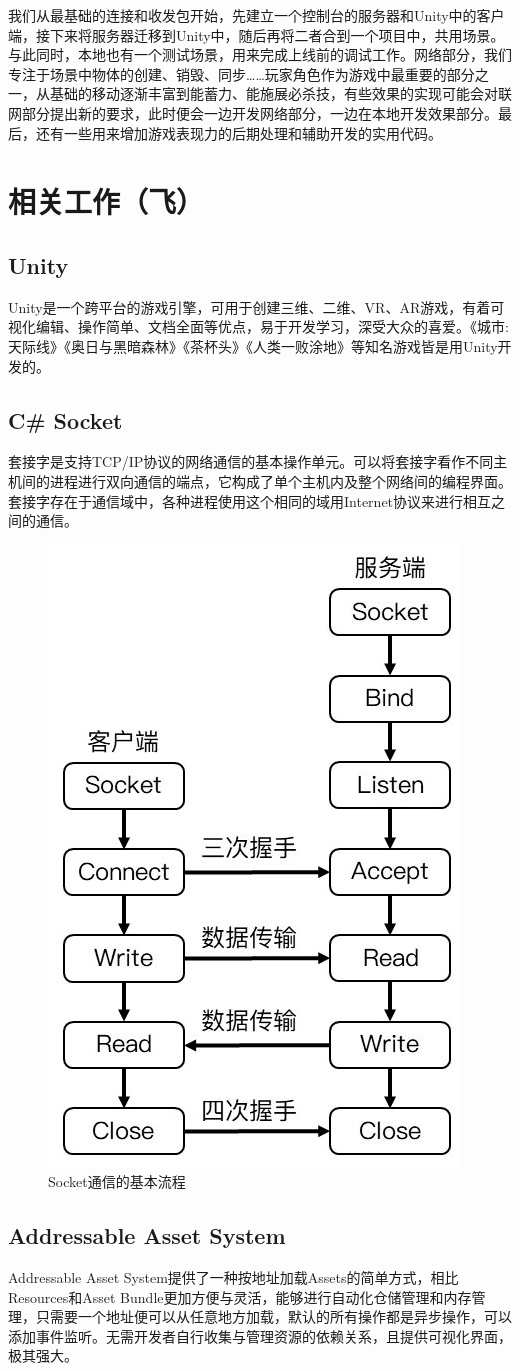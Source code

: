 \documentclass[conference]{IEEEtran}
\begin{document}
我们从最基础的连接和收发包开始，先建立一个控制台的服务器和Unity中的客户端，接下来将服务器迁移到Unity中，随后再将二者合到一个项目中，共用场景。与此同时，本地也有一个测试场景，用来完成上线前的调试工作。网络部分，我们专注于场景中物体的创建、销毁、同步……玩家角色作为游戏中最重要的部分之一，从基础的移动逐渐丰富到能蓄力、能施展必杀技，有些效果的实现可能会对联网部分提出新的要求，此时便会一边开发网络部分，一边在本地开发效果部分。最后，还有一些用来增加游戏表现力的后期处理和辅助开发的实用代码。


\section{相关工作（飞）}
\subsection{Unity}
Unity是一个跨平台的游戏引擎，可用于创建三维、二维、VR、AR游戏，有着可视化编辑、操作简单、文档全面等优点，易于开发学习，深受大众的喜爱。《城市:天际线》《奥日与黑暗森林》《茶杯头》《人类一败涂地》等知名游戏皆是用Unity开发的。

\subsection{C\# Socket}
套接字是支持TCP/IP协议的网络通信的基本操作单元。可以将套接字看作不同主机间的进程进行双向通信的端点，它构成了单个主机内及整个网络间的编程界面。套接字存在于通信域中，各种进程使用这个相同的域用Internet协议来进行相互之间的通信。\cite{Unity3D网络游戏实战}

\begin{figure}[htbp]
    \centerline{\includegraphics[width=.22\textwidth]{images/Socket通信的基本流程.jpg}}
    \caption{Socket通信的基本流程}
    \label{fig:socket}
\end{figure}


\subsection{Addressable Asset System}
Addressable Asset System提供了一种按地址加载Assets的简单方式，相比Resources和Asset Bundle更加方便与灵活，能够进行自动化仓储管理和内存管理，只需要一个地址便可以从任意地方加载，默认的所有操作都是异步操作，可以添加事件监听。无需开发者自行收集与管理资源的依赖关系，且提供可视化界面，极其强大。
\end{document}
